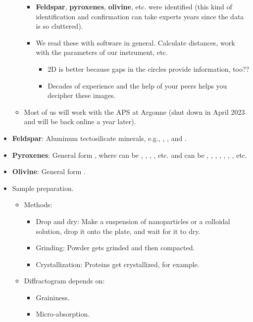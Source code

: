 \documentclass[../notes.tex]{subfiles}
\begin{document}
\begin{itemize}
\begin{itemize}
\begin{itemize}
            \item \textbf{Feldspar}, \textbf{pyroxenes}, \textbf{olivine}, etc. were identified (this kind of identification and confirmation can take experts years since the data is so cluttered).
            \item We read these with software in general. Calculate distances, work with the parameters of our instrument, etc.
            \begin{itemize}
                \item 2D is better because gaps in the circles provide information, too??
                \item Decades of experience and the help of your peers helps you decipher these images.
            \end{itemize}
        \end{itemize}
        \item Most of us will work with the APS at Argonne (shut down in April 2023 and will be back online a year later).
    \end{itemize}
    \item \textbf{Feldspar}: Aluminum tectosilicate minerals, e.g., , , and .
    \item \textbf{Pyroxenes}: General form , where  can be , , , , etc. and  can be , , , , , , , etc.
    \item \textbf{Olivine}: General form .
    \item Sample preparation.
    \begin{itemize}
        \item Methods:
        \begin{itemize}
            \item Drop and dry: Make a suspension of nanoparticles or a colloidal solution, drop it onto the plate, and wait for it to dry.
            \item Grinding: Powder gets grinded and then compacted.
            \item Crystallization: Proteins get crystallized, for example.
        \end{itemize}
        \item Diffractogram depends on:
        \begin{itemize}
            \item Graininess.
            \item Micro-absorption.

\end{itemize}
\end{itemize}
\end{itemize}
\end{document}

